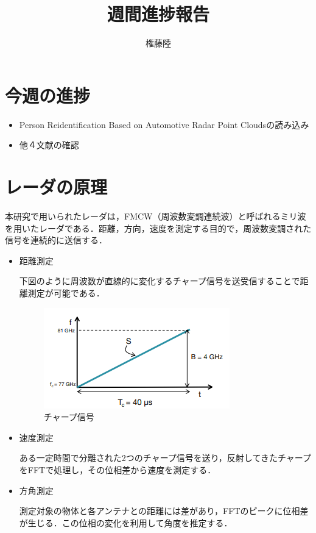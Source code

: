 \documentclass[dvipdfmx]{jsarticle}
\begin{document}
\title{週間進捗報告}
\author{権藤陸}
\maketitle
\section{今週の進捗}
\begin{itemize}
    \item Person Reidentification Based on Automotive Radar Point Cloudsの読み込み
    \item 他４文献の確認
\end{itemize}
\section{レーダの原理}
本研究で用いられたレーダは，FMCW（周波数変調連続波）と呼ばれるミリ波を用いたレーダである．距離，方向，速度を測定する目的で，周波数変調された信号を連続的に送信する．
\begin{itemize}
    \item 距離測定

下図のように周波数が直線的に変化するチャープ信号を送受信することで距離測定が可能である．

    \begin{figure}[H]
    \begin{center}
    \includegraphics[width=0.75\linewidth]{./img/charp_signal.png}
    \end{center}
    \caption{チャープ信号}
    \end{figure}

    \item 速度測定

    ある一定時間で分離された2つのチャープ信号を送り，反射してきたチャープをFFTで処理し，その位相差から速度を測定する．

    \item 方角測定

    測定対象の物体と各アンテナとの距離には差があり，FFTのピークに位相差が生じる．この位相の変化を利用して角度を推定する．
\end{itemize}
\end{document}
